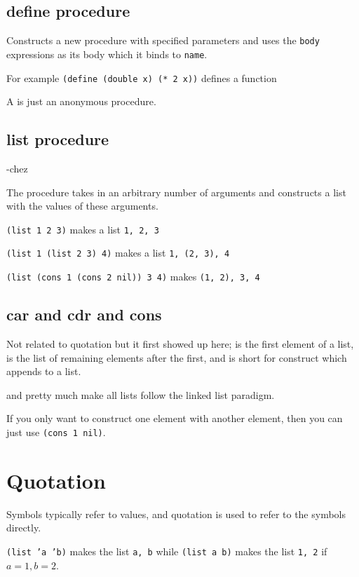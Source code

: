 \documentclass{scrartcl}
\begin{document}
\subsection{define procedure}
Constructs a new procedure with specified parameters
and uses the \texttt{body} expressions as its body
which it binds to \texttt{name}.

For example \texttt{(define (double x) (* 2 x))} defines 
a function 

A  is just an anonymous procedure.

\subsection{list procedure}
 -chez

The  procedure takes in an arbitrary number
of arguments and constructs a list with the values of 
these arguments.

\texttt{(list 1 2 3)} makes a list \texttt{1, 2, 3}

\texttt{(list 1 (list 2 3) 4)} makes a list \texttt{1, (2, 3), 4}

\texttt{(list (cons 1 (cons 2 nil)) 3 4)} makes \texttt{(1, 2), 3, 4}

\subsection{car and cdr and cons}
Not related to quotation but it first showed up here; 
 is the first element of a list, 
is the list of remaining elements after the first, and 
 is short for construct which appends to a list. 

 and  pretty much make all lists follow the
linked list paradigm.

If you only want to construct one element 
with another element, then you can just use \texttt{(cons 1 nil)}.

\section{Quotation}
Symbols typically refer to values, and quotation is used to refer 
to the symbols directly. 

\texttt{(list 'a 'b)} makes the list \texttt{a, b}
while \texttt{(list a b)} makes the list \texttt{1, 2}
if $a=1, b=2$.
\end{document}
